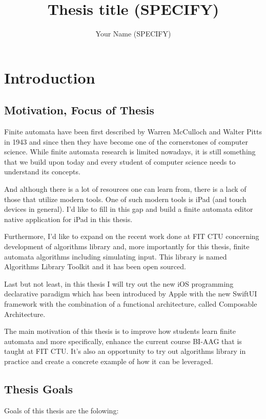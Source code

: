 \documentclass[thesis=B,english]{FITthesis}[2019/12/23]
\title{Thesis title (SPECIFY)}
\author{Your Name (SPECIFY)} %
\begin{document}

\chapter{Introduction}

\section{Motivation, Focus of Thesis}

Finite automata have been first described by Warren McCulloch and Walter Pitts in 1943 and since then they have become one of the cornerstones of computer science. While finite automata research is limited nowadays, it is still something that we build upon today and every student of computer science needs to understand its concepts.

And although there is a lot of resources one can learn from, there is a lack of those that utilize modern tools. One of such modern tools is iPad (and touch devices in general). I'd like to fill in this gap and build a finite automata editor native application for iPad in this thesis.

Furthermore, I'd like to expand on the recent work done at FIT CTU concerning development of algorithms library and, more importantly for this thesis, finite automata algorithms including simulating input. This library is named Algorithms Library Toolkit and it has been open sourced.

Last but not least, in this thesis I will try out the new iOS programming declarative paradigm which has been introduced by Apple with the new SwiftUI framework with the combination of a functional architecture, called Composable Architecture.

The main motivation of this thesis is to improve how students learn finite automata and more specifically, enhance the current course BI-AAG that is taught at FIT CTU. It's also an opportunity to try out algorithms library in practice and create a concrete example of how it can be leveraged.

\section{Thesis Goals}

Goals of this thesis are the folowing:
\end{document}
